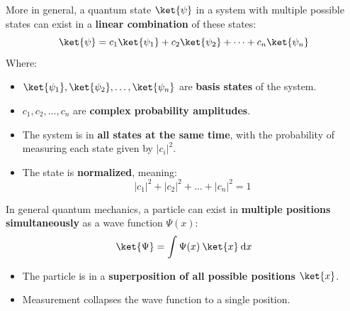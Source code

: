 \highspace
More in general, a quantum state $\ket{\psi}$ in a system with multiple possible states can exist in a \textbf{linear combination} of these states:
\begin{equation*}
    \ket{\psi} = c_{1} \ket{\psi_{1}} + c_{2} \ket{\psi_{2}} + \dots + c_{n} \ket{\psi_{n}}    
\end{equation*}
Where:
\begin{itemize}
    \item $\ket{\psi_{1}}, \ket{\psi_{2}}, \dots, \ket{\psi_{n}}$ are \textbf{basis states} of the system.
    
    \item $c_{1}, c_{2}, \dots, c_{n}$ are \textbf{complex probability amplitudes}.

    \item The system is in \textbf{all states at the same time}, with the probability of measuring each state given by $\left|c_{i}\right|^{2}$.

    \item The state is \textbf{normalized}, meaning:
    \begin{equation*}
        \left|c_{1}\right|^{2} + \left|c_{2}\right|^{2} + \dots + \left|c_{n}\right|^{2} = 1
    \end{equation*}
\end{itemize}

\begin{examplebox}
    In general quantum mechanics, a particle can exist in \textbf{multiple positions simultaneously} as a wave function $\Psi(x)$:
    \begin{equation*}
        \ket{\Psi} = \displaystyle\int \Psi(x) \: \ket{x} \: \mathrm{d}x  
    \end{equation*}
    \begin{itemize}
      \item The particle is in a \textbf{superposition of all possible positions} $\ket{x}$.
      \item Measurement collapses the wave function to a single position.
    \end{itemize}
\end{examplebox}

